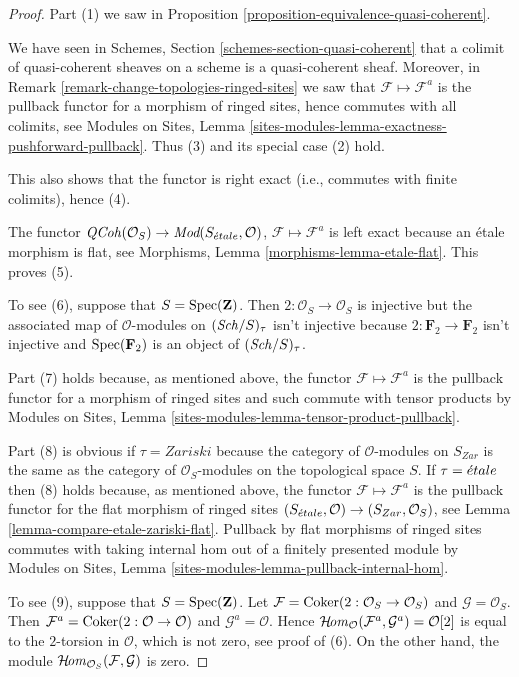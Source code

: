 \begin{proof}
Part (1) we saw in
Proposition \ref{proposition-equivalence-quasi-coherent}.

\medskip\noindent
We have seen in
Schemes, Section \ref{schemes-section-quasi-coherent}
that a colimit of quasi-coherent sheaves on a scheme is a quasi-coherent
sheaf. Moreover, in
Remark \ref{remark-change-topologies-ringed-sites}
we saw that $\mathcal{F} \mapsto \mathcal{F}^a$ is the pullback functor
for a morphism of ringed sites, hence commutes with all colimits, see
Modules on Sites, Lemma
\ref{sites-modules-lemma-exactness-pushforward-pullback}.
Thus (3) and its special case (2) hold.

\medskip\noindent
This also shows that the functor is right exact (i.e., commutes with
finite colimits), hence (4).

\medskip\noindent
The functor $\mathit{QCoh}(\mathcal{O}_S) \to
\textit{Mod}(S_{\acute{e}tale}, \mathcal{O})$,
$\mathcal{F} \mapsto \mathcal{F}^a$
is left exact because an \'etale morphism is flat, see
Morphisms, Lemma \ref{morphisms-lemma-etale-flat}.
This proves (5).

\medskip\noindent
To see (6), suppose that $S = \mathop{\mathrm{Spec}}(\mathbf{Z})$.
Then $2 : \mathcal{O}_S \to \mathcal{O}_S$ is injective but the associated
map of $\mathcal{O}$-modules on $(\mathit{Sch}/S)_\tau$ isn't
injective because $2 : \mathbf{F}_2 \to \mathbf{F}_2$ isn't injective
and $\mathop{\mathrm{Spec}}(\mathbf{F}_2)$ is an object of $(\mathit{Sch}/S)_\tau$.

\medskip\noindent
Part (7) holds because, as mentioned above, the functor
$\mathcal{F} \mapsto \mathcal{F}^a$ is the pullback functor
for a morphism of ringed sites and such commute with tensor
products by Modules on Sites, Lemma
\ref{sites-modules-lemma-tensor-product-pullback}.

\medskip\noindent
Part (8) is obvious if $\tau = Zariski$ because the category of
$\mathcal{O}$-modules on $S_{Zar}$ is the same as the category
of $\mathcal{O}_S$-modules on the topological space $S$.
If $\tau = {\acute{e}tale}$ then (8) holds because, as mentioned above,
the functor $\mathcal{F} \mapsto \mathcal{F}^a$ is the pullback functor
for the flat morphism of ringed sites
$(S_{\acute{e}tale}, \mathcal{O}) \to (S_{Zar}, \mathcal{O}_S)$, see
Lemma \ref{lemma-compare-etale-zariski-flat}.
Pullback by flat morphisms of ringed sites commutes with
taking internal hom out of a finitely presented module by
Modules on Sites, Lemma \ref{sites-modules-lemma-pullback-internal-hom}.

\medskip\noindent
To see (9), suppose that $S = \mathop{\mathrm{Spec}}(\mathbf{Z})$. Let
$\mathcal{F} = \mathop{\mathrm{Coker}}(2 : \mathcal{O}_S \to \mathcal{O}_S)$
and $\mathcal{G} = \mathcal{O}_S$.
Then $\mathcal{F}^a = \mathop{\mathrm{Coker}}(2 : \mathcal{O} \to \mathcal{O})$
and $\mathcal{G}^a = \mathcal{O}$.
Hence
$\mathop{\mathcal{H}\!\mathit{om}}\nolimits_\mathcal{O}(\mathcal{F}^a, \mathcal{G}^a) = \mathcal{O}[2]$
is equal to the $2$-torsion in $\mathcal{O}$, which is not zero,
see proof of (6). On the other hand, the module
$\mathop{\mathcal{H}\!\mathit{om}}\nolimits_{\mathcal{O}_S}(\mathcal{F}, \mathcal{G})$
is zero.


\end{proof}

